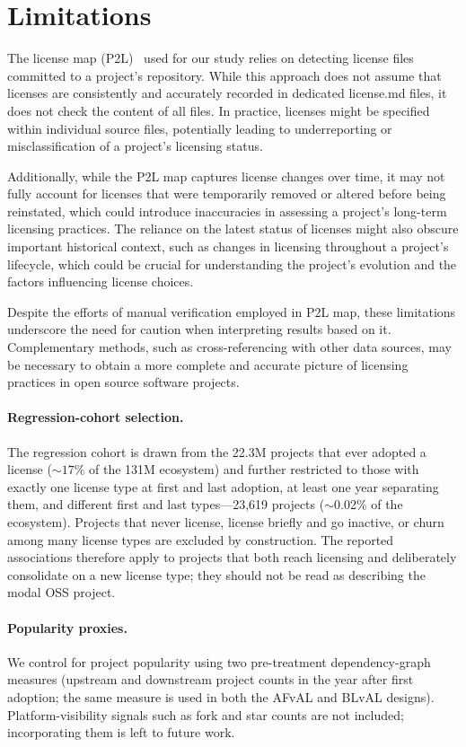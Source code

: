 \section{Limitations}

The license map (P2L)~\cite{jahanshahi2024license} used for our study 
relies on detecting license files committed to a
project's repository. While this approach does not assume that
licenses are consistently and accurately recorded in dedicated
license.md files, it does not check the content of all
files. In practice, licenses might be
specified within individual source files, potentially leading to
underreporting or misclassification of a project's licensing status.

Additionally, while the P2L map captures license changes over time,
it may not fully account for licenses that were temporarily removed
or altered before being reinstated, which could introduce
inaccuracies in assessing a project's long-term licensing practices.
The reliance on the latest status of licenses might also obscure
important historical context, such as changes in licensing
throughout a project's lifecycle, which could be crucial for
understanding the project's evolution and the factors influencing
license choices.

Despite the efforts of manual verification employed in P2L map,
these limitations underscore the need for caution when interpreting
results based on it. Complementary methods, such as
cross-referencing with other data sources, may be necessary to
obtain a more complete and accurate picture of licensing practices
in open source software projects.

\paragraph{Regression-cohort selection.} The regression cohort is drawn
from the 22.3M projects that ever adopted a license (${\sim}17\%$ of the
131M ecosystem) and further restricted to those with exactly one license
type at first and last adoption, at least one year separating them, and
different first and last types---23{,}619 projects ($\sim$0.02\% of the
ecosystem). Projects that never license, license briefly and go
inactive, or churn among many license types are excluded by
construction. The reported associations therefore apply to projects that
both reach licensing and deliberately consolidate on a new license type;
they should not be read as describing the modal OSS project.

\paragraph{Popularity proxies.} We control for project popularity using
two pre-treatment dependency-graph measures (upstream and downstream
project counts in the year after first adoption; the same measure is
used in both the AFvAL and BLvAL designs). Platform-visibility signals
such as fork and star counts are not included; incorporating them is
left to future work.

